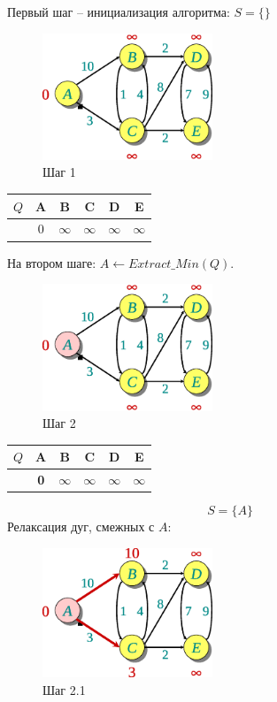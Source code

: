 \documentclass[11pt]{article}
\begin{document}
Первый шаг -- инициализация алгоритма: $S = \{\}$
\begin{figure}[h!]
  \centering
  \includegraphics[width=2in]{lecture17/dijkstra1.eps}
  \caption{Шаг 1}
\end{figure}
\begin{center}
\begin{tabular}{|r|c|c|c|c|c|}
  \hline
     $Q$ & \textbf{A} & \textbf{B} & \textbf{C} & \textbf{D} & \textbf{E} \\
  \hline
         & 0 & $\infty$ & $\infty$ & $\infty$ & $\infty$  \\
  \hline
\end{tabular}
\end{center}
\newpage
На втором шаге: $A \leftarrow Extract\_Min(Q)$.
\begin{figure}[h!]
  \centering
  \includegraphics[width=2in]{lecture17/dijkstra2.eps}
  \caption{Шаг 2}
\end{figure}
\begin{center}
\begin{tabular}{|r|c|c|c|c|c|}
  \hline
     $Q$ & A & \textbf{B} & \textbf{C} & \textbf{D} & \textbf{E} \\
  \hline
         & \textbf{0} & $\infty$ & $\infty$ & $\infty$ & $\infty$ \\
  \hline
\end{tabular}
\end{center}
\begin{equation*}
  S = \{A\}
\end{equation*}
Релаксация дуг, смежных с $A$:
\begin{figure}[h!]
  \centering
  \includegraphics[width=2in]{lecture17/dijkstra21.eps}
  \caption{Шаг 2.1}
\end{figure}
\end{document}
